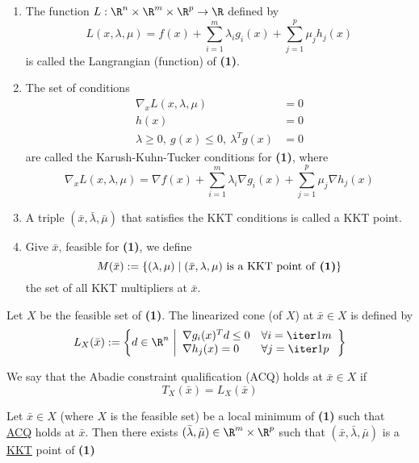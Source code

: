 \begin{enumerate}
	\item The function $L:\R^n\times\R^m\times\R^p\to\R$ defined by
	      $$
		      L(x,\lambda,\mu)=f(x)+\sum_{i=1}^m\lambda_ig_i(x)+\sum_{j=1}^p\mu_jh_j(x)
	      $$
	      is called the Langrangian (function) of \textbf{(1)}.
	\item The set of conditions
	      \begin{align*}
		      \nabla_xL(x,\lambda,\mu)                 & = 0 \\
		      h(x)                                     & = 0 \\
		      \lambda\geq0,\ g(x)\leq0,\ \lambda^Tg(x) & =0
	      \end{align*}
	      are called the Karush-Kuhn-Tucker conditions for \textbf{(1)},
	      where
	      $$\nabla_xL(x,\lambda,\mu)=\nabla f(x)+\sum_{i=1}^m\lambda_i\nabla g_i(x)+\sum_{j=1}^p\mu_j\nabla h_j(x)$$
	\item A triple $(\bar x,\bar\lambda,\bar\mu)$ that satisfies the
	      KKT conditions is called a KKT point.
	\item Give $\bar x$, feasible for \textbf{(1)}, we define
	      $$
		      M(\bar x):=\{(\lambda,\mu)\mid(\bar x,\lambda,\mu)\text{ is a KKT point of \textbf{(1)}} \}
	      $$
	      the set of all KKT multipliers at $\bar x$.
\end{enumerate}

\label{ca4f471}

Let $X$ be the feasible set of \textbf{(1)}. The linearized cone (of
$X$) at $\bar x\in X$ is defined by
$$
	L_X(\bar x):=\left\{ d\in\R^n\ \middle\vert
	\begin{array}{l l}
		\nabla g_i(x)^Td\leq0 & \forall i=\iter1m \\
		\nabla h_j(x)=0       & \forall j=\iter1p
	\end{array}
	\right\}
$$

\label{adc266e}

We say that the Abadie constraint qualification (ACQ) holds at $\bar
	x\in X$ if
$$
	T_X(\bar x)=L_X(\bar x)
$$


Let $\bar x\in X$ (where $X$ is the feasible set) be a local minimum
of \textbf{(1)} such that \hyperref[adc266e]{ACQ} holds at $\bar x$.
Then there exists $(\bar\lambda,\bar\mu)\in\R^m\times\R^p$ such that
$(\bar x,\bar\lambda,\bar\mu)$ is a \hyperref[b38093d]{KKT} point of
\textbf{(1)}

